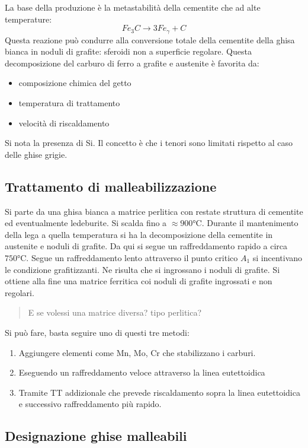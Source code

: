 La base della produzione è la metastabilità della cementite che ad alte temperature:
\begin{equation}
Fe_3C \rightarrow 3Fe_{\gamma}+C
\end{equation}
Questa reazione può condurre alla conversione totale della cementite della ghisa bianca in noduli di grafite: sferoidi non a superficie regolare.
Questa decomposizione del carburo di ferro a grafite e austenite è favorita da:
\begin{itemize}
\item composizione chimica del getto
\item temperatura di trattamento
\item velocità di riscaldamento
\end{itemize}
Si nota la presenza di Si. Il concetto è che i tenori sono limitati rispetto al caso delle ghise grigie. 

\subsection{Trattamento di malleabilizzazione}
Si parte da una ghisa bianca a matrice perlitica con restate struttura di cementite ed eventualmente ledeburite.
Si scalda fino a $\approx 900\unit{\celsius}$. Durante il mantenimento della lega a quella temperatura si ha la decomposizione della cementite in austenite e noduli di grafite. Da qui si segue un raffreddamento rapido a circa $750\unit{\celsius}$. Segue un raffreddamento lento attraverso il punto critico $A_1$ si incentivano le condizione grafitizzanti. Ne risulta che si ingrossano i noduli di grafite. Si ottiene alla fine una matrice ferritica coi noduli di grafite ingrossati e non regolari.

\begin{quote}
E se volessi una matrice diversa? tipo perlitica?
\end{quote}
Si può fare, basta seguire uno di questi tre metodi:
\begin{enumerate}
\item Aggiungere elementi come Mn, Mo, Cr che stabilizzano i carburi.
\item Eseguendo un raffreddamento veloce attraverso la linea eutettoidica
\item Tramite \ac{TT} addizionale che prevede riscaldamento sopra la linea eutettoidica e successivo raffreddamento più rapido.
\end{enumerate}
\subsection{Designazione ghise malleabili}

